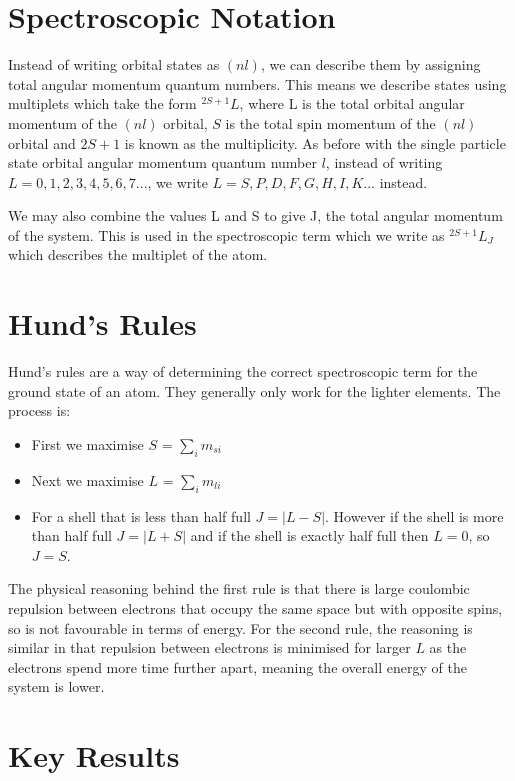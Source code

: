 \section{Spectroscopic Notation}

Instead of writing orbital states as $(nl)$, we can describe them by assigning total angular momentum quantum numbers. This means we describe states using multiplets which take the form $^{2S + 1}L$, where L is the total orbital angular momentum of the $(nl)$ orbital, $S$ is the total spin momentum of the $(nl)$ orbital and $2S + 1$ is known as the multiplicity. As before with the single particle state orbital angular momentum quantum number $l$, instead of writing $L = 0, 1, 2, 3, 4, 5, 6, 7 ...$, we write $L = S, P, D, F, G, H, I, K ...$ instead.

\noindent We may also combine the values L and S to give J, the total angular momentum of the system. This is used in the spectroscopic term which we write as $^{2S + 1}L_J$ which describes the multiplet of the atom.

\section{Hund's Rules}

Hund's rules are a way of determining the correct spectroscopic term for the ground state of an atom. They generally only work for the lighter elements. The process is:

\begin{itemize}
    \item First we maximise $S$ = $\sum_i m_{si}$
    \item Next we maximise $L$ = $\sum_i m_{li}$
    \item For a shell that is less than half full $J = |L - S|$. However if the shell is more than half full $J = |L + S|$ and if the shell is exactly half full then $L = 0$, so $J = S$.
\end{itemize}

\noindent The physical reasoning behind the first rule is that there is large coulombic repulsion between electrons that occupy the same space but with opposite spins, so is not favourable in terms of energy. For the second rule, the reasoning is similar in that repulsion between electrons is minimised for larger $L$ as the electrons spend more time further apart, meaning the overall energy of the system is lower.



\section{Key Results}

